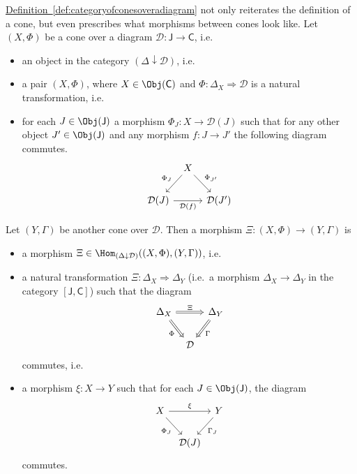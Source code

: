 \documentclass[main.tex]{subfiles}
\begin{document}
\hyperref[def:categoryofconesoveradiagram]{Definition~\ref*{def:categoryofconesoveradiagram}} not only reiterates the definition of a cone, but even prescribes what morphisms between cones look like. Let $(X, \Phi)$ be a cone over a diagram $\mathcal{D}\colon \mathsf{J} \rightarrow \mathsf{C}$, i.e.
\begin{itemize}
  \item an object in the category $(\Delta \downarrow \mathcal{D})$, i.e.
  \item a pair $(X, \Phi)$, where $X \in \Obj(\mathsf{C})$ and $\Phi\colon \Delta_{X} \Rightarrow \mathcal{D}$ is a natural transformation, i.e.
  \item for each $J \in \Obj(\mathsf{J})$ a morphism $\Phi_{J}\colon X \to \mathcal{D}(J)$ such that for any other object $J' \in \Obj(\mathsf{J})$ and any morphism $f\colon J \to J'$ the following diagram commutes.
    \begin{equation*}
      \begin{tikzcd}[column sep=tiny]
        & X
        \arrow[ld, swap, "\Phi_{J}"]
        \arrow[rd, "\Phi_{J'}"]
        \\
        \mathcal{D}(J)
        \arrow[rr, swap, "\mathcal{D}(f)"]
        & & \mathcal{D}(J')
      \end{tikzcd}
    \end{equation*}
\end{itemize}

Let $(Y, \Gamma)$ be another cone over $\mathcal{D}$. Then a morphism $\Xi\colon (X, \Phi) \to (Y, \Gamma)$ is
\begin{itemize}
  \item a morphism $\Xi \in \Hom_{(\Delta \downarrow \mathcal{D})}((X, \Phi), (Y, \Gamma))$, i.e.
  \item a natural transformation $\Xi\colon \Delta_{X} \Rightarrow \Delta_{Y}$ (i.e.\ a morphism $\Delta_{X} \to \Delta_{Y}$ in the category $[\mathsf{J}, \mathsf{C}]$) such that the diagram
    \begin{equation*}
      \begin{tikzcd}[column sep=tiny]
        \Delta_{X}
        \arrow[rr, Rightarrow, "\Xi"]
        \arrow[rd, swap, Rightarrow, "\Phi"]
        & &  \Delta_{Y}
        \arrow[ld, Rightarrow, "\Gamma"]
        \\
        & \mathcal{D}
      \end{tikzcd}
    \end{equation*}
    commutes, i.e.
  \item a morphism $\xi\colon X \to Y$ such that for each $J \in \Obj(\mathsf{J})$, the diagram
    \begin{equation*}
      \begin{tikzcd}[column sep=tiny]
        X
        \arrow[rr, "\xi"]
        \arrow[rd, swap, "\Phi_{J}"]
        & & Y
        \arrow[ld, "\Gamma_{J}"]
        \\
        & \mathcal{D}(J)
      \end{tikzcd}
    \end{equation*}
    commutes.
\end{itemize}
\end{document}
